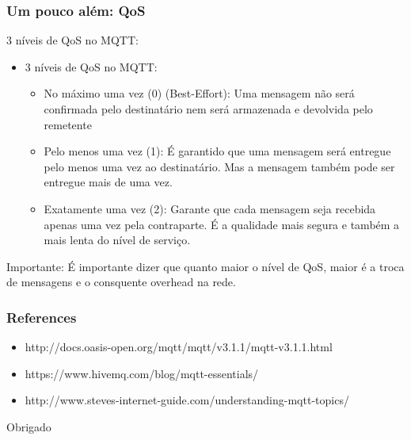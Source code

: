 \documentclass{beamer}
\begin{document}
\begin{frame}
\frametitle{Um pouco além: QoS}

3 níveis de QoS no MQTT:
\begin{itemize}
\item 3 níveis de QoS no MQTT:

\begin{itemize}
\item No máximo uma vez (0) (Best-Effort): Uma mensagem não será confirmada pelo destinatário nem será armazenada e devolvida pelo remetente
\item Pelo menos uma vez (1): É garantido que uma mensagem será entregue pelo menos uma vez ao destinatário. Mas a mensagem também pode ser entregue mais de uma vez.

\item Exatamente uma vez (2): Garante que cada mensagem seja recebida apenas uma vez pela contraparte. É a qualidade mais segura e também a mais lenta do nível de serviço.
\end{itemize}
\end{itemize}

\begin{block}{Importante:}
É importante dizer que quanto maior o nível de QoS, maior é a troca de mensagens e o consquente overhead na rede.
\end{block}
\end{frame}







\begin{frame}
\frametitle{References}
\begin{itemize}
\item http://docs.oasis-open.org/mqtt/mqtt/v3.1.1/mqtt-v3.1.1.html
\item https://www.hivemq.com/blog/mqtt-essentials/
\item http://www.steves-internet-guide.com/understanding-mqtt-topics/
\end{itemize}
\end{frame}


\begin{frame}
\Huge{\centerline{Obrigado}}
\end{frame}

\end{document}

